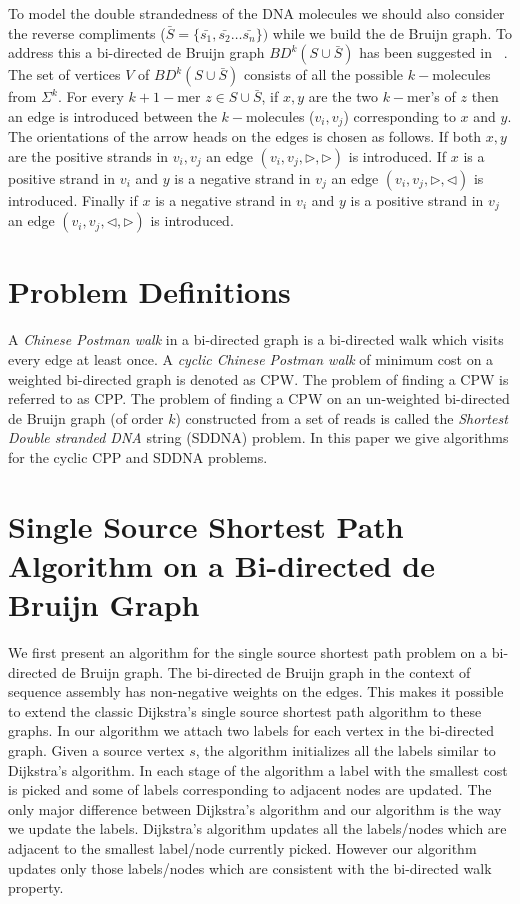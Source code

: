 \documentclass[runningheads]{llncs}
\begin{document}
To model the double strandedness of the DNA molecules we should also consider the reverse 
compliments ($\bar{S} =\{\bar{s_1},\bar{s_2}\ldots \bar{s_n}\})$ while we build the de Bruijn graph. 
To address this a bi-directed de Bruijn graph $BD^k(S\cup \bar{S})$ has been suggested in 
~\cite{bidirected_graph}. The set of vertices $V$ of $BD^k(S\cup \bar{S})$ consists of all the 
possible $k-$molecules from $\Sigma^k$. For every $k+1-$mer $z \in S\cup \bar{S}$, if $x,y$ are 
the two $k-$mer's of $z$ then an edge is introduced between the $k-$molecules ($v_i,v_j$) corresponding 
to $x$ and $y$. The orientations of the arrow heads on the edges is chosen as follows. If both $x,y$ 
are the positive strands in $v_i,v_j$ an edge $(v_i,v_j,\rhd,\rhd)$ is introduced. If $x$ is a positive 
strand in $v_i$ and $y$ is a negative strand in $v_j$ an edge $(v_i,v_j,\rhd,\lhd)$ is introduced. 
Finally if $x$ is a negative strand in $v_i$ and $y$ is a positive strand in $v_j$ an 
edge $(v_i,v_j,\lhd,\rhd)$ is introduced. 

\section{Problem Definitions}
\label{sec:prob-def}
A {\em Chinese Postman walk} in a bi-directed graph is a bi-directed walk which visits every 
edge at least once. A {\em cyclic Chinese Postman walk} of minimum cost on a weighted bi-directed graph is denoted as CPW. The problem of finding a CPW is referred to as CPP. The problem of finding a CPW on an un-weighted 
bi-directed de Bruijn graph (of order $k$) constructed from a set of reads is called the
{\em Shortest Double stranded DNA} string (SDDNA) problem.  In this paper we give algorithms for the cyclic CPP and SDDNA problems.

\section{Single Source Shortest Path Algorithm on a Bi-directed de Bruijn Graph}
\label{sec:bi-short-path}
We first present an algorithm for the single source shortest path problem on a 
bi-directed de Bruijn graph. The bi-directed de Bruijn graph in the context of 
sequence assembly has non-negative weights on the edges. This makes it possible to 
extend the classic Dijkstra's single source shortest path algorithm to these
graphs. In our algorithm we attach two labels for each vertex in the bi-directed 
graph. Given a source vertex $s$, the algorithm initializes all the labels
similar to Dijkstra's algorithm. In each stage of the algorithm a label with 
the smallest cost is picked and some of labels corresponding to adjacent
nodes are updated. The only major difference between Dijkstra's algorithm 
and our algorithm is the way we update the labels. Dijkstra's algorithm 
updates all the labels/nodes which are adjacent to the smallest label/node
currently picked. However our algorithm updates only those labels/nodes which
are consistent with the bi-directed walk property.  
\end{document}
